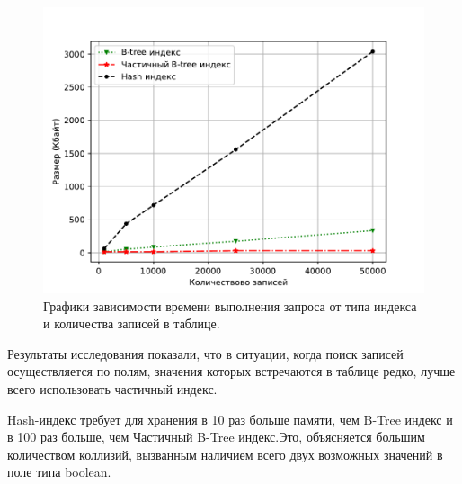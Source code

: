 \begin{figure}[h]
	\centering
	\includegraphics[width=1\textwidth, height=0.4\textheight]{research/mem}
	\caption{Графики зависимости времени выполнения запроса от типа индекса и количества записей в таблице.}
	\label{fig:memIdx}
\end{figure}

Результаты исследования показали, что в ситуации, когда поиск записей осуществляется по полям, значения которых встречаются в таблице редко, лучше всего использовать частичный индекс.

Hash-индекс требует для хранения в 10 раз больше памяти, чем B-Tree индекс и в 100 раз больше, чем Частичный B-Tree индекс.Это, объясняется большим количеством коллизий, вызванным наличием всего двух возможных значений в поле типа boolean.
